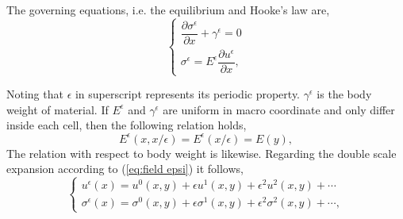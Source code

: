 The governing equations, i.e. the equilibrium and Hooke's law are,
\begin{equation}
\left\{
\begin{array}{l}
\dfrac{\partial \sigma^{\epsilon}}{\partial x} + \gamma^{\epsilon} = 0 \\
\sigma^{\epsilon} = E^{\epsilon} \dfrac{\partial u^{\epsilon}}{\partial x},
\end{array}
\right.
\end{equation}

Noting that $\epsilon$ in superscript represents its periodic property. $\gamma^{\epsilon}$ is the body weight of material. If $E^{\epsilon}$ and $\gamma^{\epsilon}$ are uniform in macro coordinate and only differ inside each cell, then the following relation holds,
\begin{equation}
E^{\epsilon}(x,x/\epsilon)=E^{\epsilon}(x/\epsilon)=E(y),
\end{equation}
The relation with respect to body weight is likewise. Regarding the double scale expansion according to (\ref{eq:field epsi}) it follows,
\begin{equation}
\left\{
\begin{array}{l}
u^{\epsilon}(x) = u^{0}(x,y) + \epsilon u^{1}(x,y) + \epsilon^{2} u^{2}(x,y) + \cdots \\
\sigma^{\epsilon}(x) = \sigma^{0}(x,y) + \epsilon \sigma^{1}(x,y) + \epsilon^{2} \sigma^{2}(x,y) + \cdots,
\end{array}
\right.
\end{equation}

